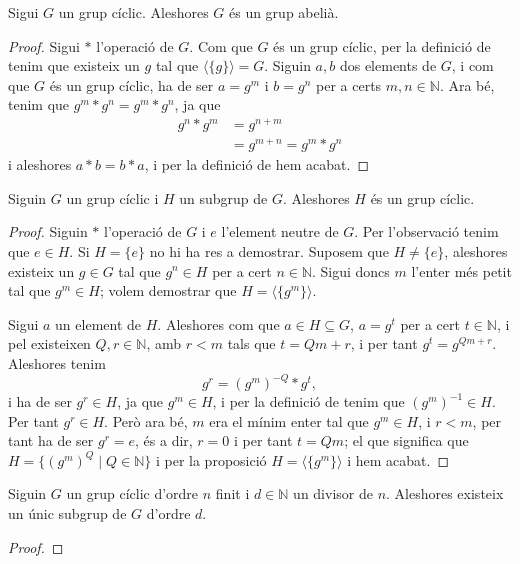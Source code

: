 \documentclass[../Apunts.tex]{subfiles}
\begin{document}
	\begin{proposition}
		Sigui \(G\) un grup cíclic. Aleshores \(G\) és un grup abelià.
		\begin{proof}
			Sigui \(\ast\) l'operació de \(G\). Com que \(G\) és un grup cíclic, per la definició de  tenim que existeix un \(g\) tal que \(\langle\{g\}\rangle=G\). Siguin \(a,b\) dos  elements de \(G\), i com que \(G\) és un grup cíclic, ha de ser \(a=g^{m}\) i \(b=g^{n}\) per a certs \(m,n\in\mathbb{N}\). Ara bé, tenim que \(g^{m}\ast g^{n}=g^{m}\ast g^{n}\), ja que
			\begin{align*}
			g^{n}\ast g^{m}&=g^{n+m}\\
			&=g^{m+n}=g^{m}\ast g^{n}
			\end{align*}
			i aleshores \(a\ast b=b\ast a\), i per la definició de  hem acabat.
		\end{proof}
	\end{proposition}
	\begin{proposition}
		Siguin \(G\) un grup cíclic i \(H\) un subgrup de \(G\). Aleshores \(H\) és un grup cíclic.
		\begin{proof}
			Siguin \(\ast\) l'operació de \(G\) i \(e\) l'element neutre de \(G\). Per l'observació  tenim que \(e\in H\). Si \(H=\{e\}\) no hi ha res a demostrar. Suposem que \(H\neq\{e\}\), aleshores existeix un \(g\in G\) tal que \(g^{n}\in H\) per a cert \(n\in\mathbb{N}\). Sigui doncs \(m\) l'enter més petit tal que \(g^{m}\in H\); volem demostrar que \(H=\langle\{g^{m}\}\rangle\).
			
			Sigui \(a\) un element de \(H\). Aleshores com que \(a\in H\subseteq G\), \(a=g^{t}\) per a cert \(t\in\mathbb{N}\), i pel  existeixen \(Q,r\in\mathbb{N}\), amb \(r<m\) tals que \(t=Qm+r\), i per tant \(g^{t}=g^{Qm+r}\). Aleshores tenim
			\[g^{r}=\left(g^{m}\right)^{-Q}\ast g^{t},\]
			i ha de ser \(g^{r}\in H\), ja que \(g^{m}\in H\), i per la definició de  tenim que \(\left(g^{m}\right)^{-1}\in H\). Per tant \(g^{r}\in H\). Però ara bé, \(m\) era el mínim enter tal que \(g^{m}\in H\), i \(r<m\), per tant ha de ser \(g^{r}=e\), és a dir, \(r=0\) i per tant \(t=Qm\); el que significa que \(H=\{\left(g^{m}\right)^{Q}\mid Q\in\mathbb{N}\}\) i per la proposició  \(H=\langle\{g^{m}\}\rangle\) i hem acabat.
		\end{proof}
	\end{proposition}
	\begin{proposition}
		\label{prop:existència i unicitat de subgrups cíclics d'ordres divisors}
		Siguin \(G\) un grup cíclic d'ordre \(n\) finit i \(d\in\mathbb{N}\) un divisor de \(n\). Aleshores existeix un únic subgrup de \(G\) d'ordre \(d\).
		\begin{proof}
		\end{proof}
	\end{proposition}
\end{document}

